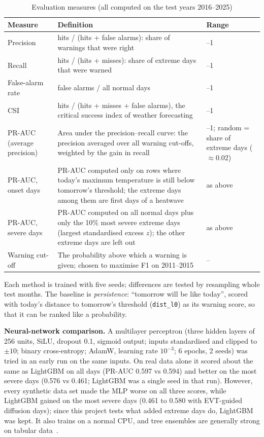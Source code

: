 \documentclass[12pt,a4paper]{report}
\begin{document}
\begin{table}[H]
\centering
\caption{Evaluation measures (all computed on the test years 2016--2025)}
\label{tab:metrics}
\footnotesize
\begin{tabularx}{\textwidth}{|>{\raggedright\arraybackslash}p{3.0cm}|X|>{\raggedright\arraybackslash}p{2.6cm}|}
\hline
\textbf{Measure} & \textbf{Definition} & \textbf{Range}\\ \hline
Precision & hits / (hits + false alarms): share of warnings that were right & 0--1 \\ \hline
Recall & hits / (hits + misses): share of extreme days that were warned & 0--1 \\ \hline
False-alarm rate & false alarms / all normal days & 0--1 \\ \hline
CSI & hits / (hits + misses + false alarms), the critical success index of weather forecasting & 0--1 \\ \hline
PR-AUC (average precision) & Area under the precision--recall curve: the precision averaged over all warning cut-offs,
  weighted by the gain in recall & 0--1; random = share of extreme days ($\approx$0.02) \\ \hline
PR-AUC, onset days & PR-AUC computed only on rows where today's maximum temperature is still below tomorrow's threshold; the extreme days among them are first days of a heatwave & as above \\ \hline
PR-AUC, severe days & PR-AUC computed on all normal days plus only the 10\% most severe extreme days (largest standardised excess $z$); the other extreme days are left out & as above \\ \hline
Warning cut-off & The probability above which a warning is given; chosen to maximise F1 on 2011--2015 & -- \\ \hline
\end{tabularx}
\end{table} Each method is trained with five seeds;
differences are tested by resampling whole test months. The baseline is \emph{persistence}: ``tomorrow will be like
today'', scored with today's distance to tomorrow's threshold (\texttt{dist\_l0}) as its warning score, so that it can be
ranked like a probability.

\textbf{Neural-network comparison.} A multilayer perceptron (three hidden layers of 256 units, SiLU, dropout 0.1,
sigmoid output; inputs standardised and clipped to $\pm10$; binary cross-entropy; AdamW, learning rate $10^{-3}$;
6 epochs, 2 seeds) was tried in an early run on the same inputs. On real data alone it scored about the same as LightGBM
on all days (PR-AUC 0.597 vs 0.594) and better on the most severe days (0.576 vs 0.461; LightGBM was a single seed in that run). However, every
synthetic data set made the MLP worse on all three scores, while LightGBM gained on the most severe days (0.461
to 0.580 with EVT-guided diffusion days); since this project tests what added extreme days do, LightGBM was kept.
It also trains on a normal CPU, and tree ensembles are generally strong on tabular data~\cite{grinsztajn2022tree}.
\end{document}
